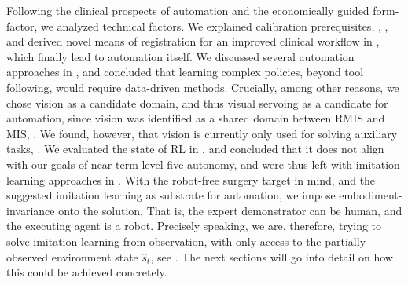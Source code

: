 Following the clinical prospects of automation and the economically guided form-factor, we analyzed technical factors. We explained calibration prerequisites, , , and derived novel means of registration for an improved clinical workflow in , which finally lead to automation itself. We discussed several automation approaches in , and concluded that learning complex policies, beyond tool following, would require data-driven methods. Crucially, among other reasons, we chose vision as a candidate domain, and thus visual servoing as a candidate for automation, since vision was identified as a shared domain between RMIS and MIS, . We found, however, that vision is currently only used for solving auxiliary tasks, . We evaluated the state of RL in , and concluded that it does not align with our goals of near term level five autonomy, and were thus left with imitation learning approaches in . With the robot-free surgery target in mind, and the suggested imitation learning as substrate for automation, we impose embodiment-invariance onto the solution. That is, the expert demonstrator can be human, and the executing agent is a robot. Precisely speaking, we are, therefore, trying to solve imitation learning from observation, with only access to the partially observed environment state $\hat{s}_t$, see . The next sections will go into detail on how this could be achieved concretely.

